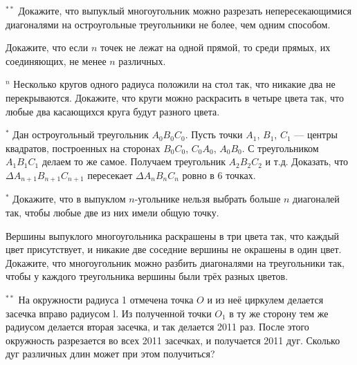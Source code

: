 \begin{thm} $^{**}$
Докажите, что выпуклый многоугольник можно разрезать непересекающимися диагоналями на остроугольные треугольники не более, чем одним способом.
\end{thm}

\begin{thm}
Докажите, что если $n$ точек не лежат на одной прямой, то среди прямых, их соединяющих, не менее $n$ различных.
\end{thm}

\begin{thm} $^n$
Несколько кругов одного радиуса положили на стол так, что никакие два не перекрываются. Докажите, что круги можно раскрасить в четыре цвета так, что любые два касающихся круга будут разного цвета.
\end{thm}

\begin{thm} $^*$
Дан остроугольный треугольник $A_0B_0C_0$. Пусть точки $A_1$, $B_1$, $C_1$ — центры квадратов, построенных на сторонах $B_0C_0$, $C_0A_0$, $A_0B_0$. С треугольником $A_1B_1C_1$ делаем то же самое. Получаем треугольник $A_2B_2C_2$ и т.д. Доказать, что $\Delta A_{n + 1}B_{n + 1}C_{n + 1}$ пересекает $\Delta A_nB_nC_n$ ровно в 6 точках.
\end{thm}

\begin{thm} $^*$
    Докажите, что в выпуклом $n$-угольнике нельзя выбрать больше $n$ диагоналей так, чтобы любые две из них имели общую точку.
\end{thm}

\begin{thm}
    Вершины выпуклого многоугольника раскрашены в три цвета так, что каждый цвет присутствует, и никакие две соседние вершины не окрашены в один цвет. Докажите, что многоугольник можно разбить диагоналями на треугольники так, чтобы у каждого треугольника вершины были трёх разных цветов.
\end{thm}

\newpage

\begin{thm} $^{**}$
    На окружности радиуса 1 отмечена точка $O$ и из неё циркулем делается засечка вправо радиусом l. Из полученной точки $O_1$ в ту же сторону тем же радиусом делается вторая засечка, и так делается 2011 раз. После этого окружность разрезается во всех 2011 засечках, и получается 2011 дуг. Сколько дуг различных длин может при этом получиться?
\end{thm}

